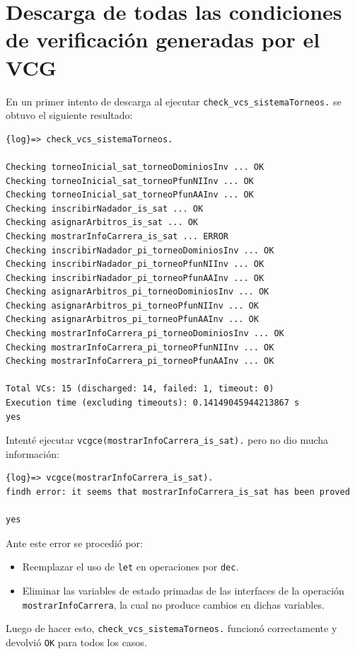 \documentclass{article}
\begin{document}
\section*{Descarga de todas las condiciones de verificación generadas por el VCG}
En un primer intento de descarga al ejecutar \verb|check_vcs_sistemaTorneos.| se obtuvo el siguiente resultado:

\begin{verbatim}
{log}=> check_vcs_sistemaTorneos.

Checking torneoInicial_sat_torneoDominiosInv ... OK
Checking torneoInicial_sat_torneoPfunNIInv ... OK
Checking torneoInicial_sat_torneoPfunAAInv ... OK
Checking inscribirNadador_is_sat ... OK
Checking asignarArbitros_is_sat ... OK
Checking mostrarInfoCarrera_is_sat ... ERROR
Checking inscribirNadador_pi_torneoDominiosInv ... OK
Checking inscribirNadador_pi_torneoPfunNIInv ... OK
Checking inscribirNadador_pi_torneoPfunAAInv ... OK
Checking asignarArbitros_pi_torneoDominiosInv ... OK
Checking asignarArbitros_pi_torneoPfunNIInv ... OK
Checking asignarArbitros_pi_torneoPfunAAInv ... OK
Checking mostrarInfoCarrera_pi_torneoDominiosInv ... OK
Checking mostrarInfoCarrera_pi_torneoPfunNIInv ... OK
Checking mostrarInfoCarrera_pi_torneoPfunAAInv ... OK

Total VCs: 15 (discharged: 14, failed: 1, timeout: 0)
Execution time (excluding timeouts): 0.14149045944213867 s
yes
\end{verbatim}

Intenté ejecutar \verb|vcgce(mostrarInfoCarrera_is_sat).| pero no dio mucha información:

\begin{verbatim}
{log}=> vcgce(mostrarInfoCarrera_is_sat).
findh error: it seems that mostrarInfoCarrera_is_sat has been proved

yes
\end{verbatim}

Ante este error se procedió por: 
\begin{itemize}
  \item Reemplazar el uso de \verb|let| en operaciones por \verb|dec|.
  \item Eliminar las variables de estado primadas de las interfaces de la operación \verb|mostrarInfoCarrera|,
  la cual no produce cambios en dichas variables.
\end{itemize}

Luego de hacer esto, \verb|check_vcs_sistemaTorneos.| funcionó correctamente y devolvió \verb|OK|
para todos los casos.
\end{document}

